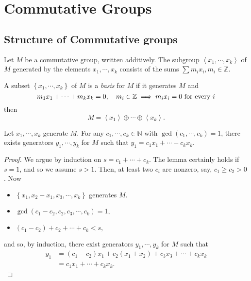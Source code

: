 \section{Commutative Groups}

\subsection{Structure of Commutative groups}
Let \( M \) be a commutative group, written additively. The subgroup \(
\left\langle x_1, \cdots, x_k \right\rangle \) of \( M \) generated by the
elements \( x_1, \cdots, x_k \) consists of the sums \( \sum m_i x_i, m_i \in
\mathbb{Z} \).
\begin{definition}
  A subset \( \left\lbrace x_1, \cdots, x_k \right\rbrace \) of \( M \) is a
  \emph{basis} for \( M \) if it generates \( M \) and
  \[
    m_1 x_1 + \cdots + m_k x_k = 0,\quad m_i \in \mathbb{Z} \implies m_i x_i = 0
    \textmd{ for every } i
  \]
  then
  \[
    M = \left\langle x_1 \right\rangle \oplus \cdots \oplus \left\langle x_k
    \right\rangle.
  \]
\end{definition}

\begin{lemma}
  Let \( x_1, \cdots, x_k \) generate \( M \). For any \( c_1, \cdots, c_k \in
  \mathbb{N} \) with \( \gcd (c_1, \cdots, c_k) = 1 \), there exists generators
  \( y_1, \cdots, y_k \) for \( M \) such that \( y_1 = c_1 x_1 + \cdots + c_k
  x_k \).
\end{lemma}
\begin{proof}
  We argue by induction on \( s = c_1 + \cdots + c_k \).
  The lemma certainly holds if \( s = 1 \), and so we assume \( s > 1 \).
  Then, at least two \( c_i \) are nonzero, say, \( c_1 \geq c_2 > 0 \).
  Now
  \begin{itemize}
    \item \( \left\lbrace x_1, x_2 + x_1, x_3, \cdots, x_k \right\rbrace \) generates \( M \).
    \item \( \gcd(c_1 - c_2, c_2, c_3, \cdots, c_k) = 1 \),
    \item \( (c_1 - c_2) + c_2 + \cdots + c_k < s \),
  \end{itemize}
  and so, by induction, there exist generators \( y_1, \cdots, y_k \) for \( M \) such that
  \begin{align*}
    y_1 &= (c_1 - c_2) x_1 + c_2(x_1 + x_2) + c_3 x_3 + \cdots + c_k x_k\\
        &= c_1 x_1 + \cdots + c_k x_k.
  \end{align*}
\end{proof}

